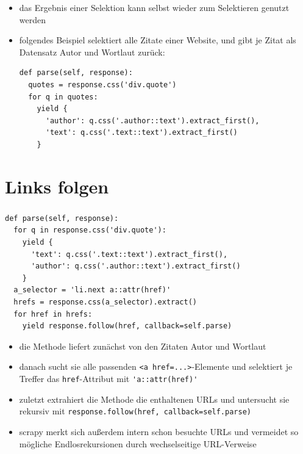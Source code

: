 \documentclass{beamer}
\begin{document}
\begin{frame}
	\framebreak
	
	\begin{itemize}
		\item das Ergebnis einer Selektion kann selbst wieder zum Selektieren genutzt werden
		\item folgendes Beispiel selektiert alle Zitate einer Website, und gibt je Zitat als Datensatz Autor und Wortlaut zurück:
	\begin{lstlisting}
def parse(self, response):
  quotes = response.css('div.quote')
  for q in quotes:
    yield {
      'author': q.css('.author::text').extract_first(),
      'text': q.css('.text::text').extract_first()
    }
	\end{lstlisting}
	\end{itemize}
\end{frame}



\section{Links folgen}
\begin{frame}
	\frametitle{\insertsection{}}
	\begin{lstlisting}
def parse(self, response):
  for q in response.css('div.quote'):
    yield {
      'text': q.css('.text::text').extract_first(),
      'author': q.css('.author::text').extract_first()
    }
  a_selector = 'li.next a::attr(href)'
  hrefs = response.css(a_selector).extract()  
  for href in hrefs:    
    yield response.follow(href, callback=self.parse)
	\end{lstlisting}
	\begin{itemize}
		\item die Methode liefert zunächst von den Zitaten Autor und Wortlaut
		\item danach sucht sie alle passenden \lstinline|<a href=...>|-Elemente und selektiert je Treffer das \lstinline|href|-Attribut mit \lstinline|'a::attr(href)'| 
		
		\framebreak
		
		\item zuletzt extrahiert die Methode die enthaltenen URLs und untersucht sie rekursiv mit \lstinline|response.follow(href, callback=self.parse)| 
		\item scrapy merkt sich außerdem intern schon besuchte URLs und vermeidet so mögliche Endlosrekursionen durch wechselseitige URL-Verweise
	\end{itemize}
\end{frame}
\end{document}
